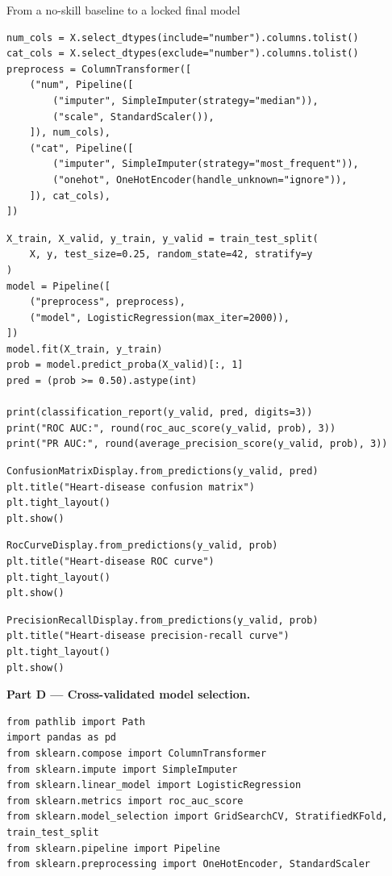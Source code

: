 \begin{labproject}{From a no-skill baseline to a locked final model}
\begin{lstlisting}[style=mlpython]
num_cols = X.select_dtypes(include="number").columns.tolist()
cat_cols = X.select_dtypes(exclude="number").columns.tolist()
preprocess = ColumnTransformer([
    ("num", Pipeline([
        ("imputer", SimpleImputer(strategy="median")),
        ("scale", StandardScaler()),
    ]), num_cols),
    ("cat", Pipeline([
        ("imputer", SimpleImputer(strategy="most_frequent")),
        ("onehot", OneHotEncoder(handle_unknown="ignore")),
    ]), cat_cols),
])
\end{lstlisting}

\begin{lstlisting}[style=mlpython]
X_train, X_valid, y_train, y_valid = train_test_split(
    X, y, test_size=0.25, random_state=42, stratify=y
)
model = Pipeline([
    ("preprocess", preprocess),
    ("model", LogisticRegression(max_iter=2000)),
])
model.fit(X_train, y_train)
prob = model.predict_proba(X_valid)[:, 1]
pred = (prob >= 0.50).astype(int)

print(classification_report(y_valid, pred, digits=3))
print("ROC AUC:", round(roc_auc_score(y_valid, prob), 3))
print("PR AUC:", round(average_precision_score(y_valid, prob), 3))
\end{lstlisting}

\begin{lstlisting}[style=mlpython]
ConfusionMatrixDisplay.from_predictions(y_valid, pred)
plt.title("Heart-disease confusion matrix")
plt.tight_layout()
plt.show()
\end{lstlisting}

\begin{lstlisting}[style=mlpython]
RocCurveDisplay.from_predictions(y_valid, prob)
plt.title("Heart-disease ROC curve")
plt.tight_layout()
plt.show()
\end{lstlisting}

\begin{lstlisting}[style=mlpython]
PrecisionRecallDisplay.from_predictions(y_valid, prob)
plt.title("Heart-disease precision-recall curve")
plt.tight_layout()
plt.show()
\end{lstlisting}

\medskip\noindent\textbf{Part D --- Cross-validated model selection.}\par
\begin{lstlisting}[style=mlpython]
from pathlib import Path
import pandas as pd
from sklearn.compose import ColumnTransformer
from sklearn.impute import SimpleImputer
from sklearn.linear_model import LogisticRegression
from sklearn.metrics import roc_auc_score
from sklearn.model_selection import GridSearchCV, StratifiedKFold, train_test_split
from sklearn.pipeline import Pipeline
from sklearn.preprocessing import OneHotEncoder, StandardScaler
\end{lstlisting}


\end{labproject}
